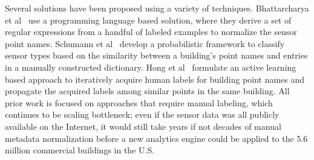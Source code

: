 Several solutions have been proposed using a variety of techniques.
Bhattarcharya et al~\cite{arka} use a programming language based solution,
where they derive a set of regular expressions from a handful of labeled examples
to normalize the sensor point names.
Schumann et al~\cite{ibm} develop a probabilistic framework to classify sensor types
based on the similarity between a building's point names and entries in a manually constructed dictionary.
Hong et al~\cite{cikm} formulate an active learning based approach to iteratively
acquire human labels for building point names and propagate the acquired labels among similar points in the same building. All prior work is focused on approaches that require manual labeling, which 
continues to be scaling bottleneck;
even if the sensor data was all publicly available on the Internet, it would still take years if not decades of manual metadata normalization before a new analytics engine could be applied to the 5.6 million commercial buildings in the U.S.

